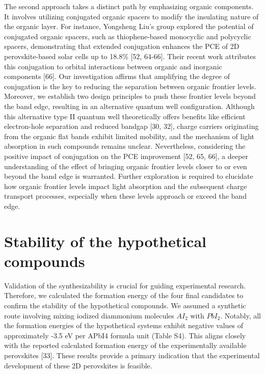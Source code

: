 The second approach takes a distinct path by emphasizing organic components. It involves utilizing conjugated organic spacers to modify the insulating nature of the organic layer. For instance, Yongsheng Liu’s group explored the potential of conjugated organic spacers, such as thiophene-based monocyclic and polycyclic spacers, demonstrating that extended conjugation enhances the PCE of 2D perovskite-based solar cells up to 18.8\% [52, 64-66]. Their recent work attributes this conjugation to orbital interactions between organic and inorganic components [66]. Our investigation affirms that amplifying the degree of conjugation is the key to reducing the separation between organic frontier levels. Moreover, we establish two design principles to push these frontier levels beyond the band edge, resulting in an alternative quantum well configuration. Although this alternative type II quantum well theoretically offers benefits like efficient electron-hole separation and reduced bandgap [30, 32], charge carriers originating from the organic flat bands exhibit limited mobility, and the mechanism of light absorption in such compounds remains unclear. Nevertheless, considering the positive impact of conjugation on the PCE improvement [52, 65, 66], a deeper understanding of the effect of bringing organic frontier levels closer to or even beyond the band edge is warranted. Further exploration is required to elucidate how organic frontier levels impact light absorption and the subsequent charge transport processes, especially when these levels approach or exceed the band edge.

\section{Stability of the hypothetical compounds}

Validation of the synthesizability is crucial for guiding experimental research. Therefore, we calculated the formation energy of the four final candidates to confirm the stability of the hypothetical compounds. We assumed a synthetic route involving mixing iodized diammonium molecules $AI_2$ with $PbI_2$. Notably, all the formation energies of the hypothetical systems exhibit negative values of approximately -3.5 eV per APbI4 formula unit (Table S4). This aligns closely with the reported calculated formation energy of the experimentally available perovskites [33]. These results provide a primary indication that the experimental development of these 2D perovskites is feasible. 

